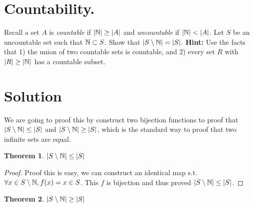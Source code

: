 
\newtheorem{theorem}{Theorem}
\newtheorem{lemma}[theorem]{Lemma}
\newtheorem{definition}{Definition}[section]


\maketitle
\thispagestyle{firststyle}
\vspace{-2.0cm}

\section{Countability.}
    Recall a set $A$ is \emph{countable} if $|\mathbb{N}| \geq |A|$ and \emph{uncountable} if $|\mathbb{N}| < |A|$.
    Let $S$ be an uncountable set such that $\mathbb{N} \subset S$.
    Show that $|S \setminus \mathbb{N}| = |S|.$
    {\bf Hint:}
    Use the facts that
    1) the union of two countable sets is countable,
    and
    2) every set $R$ with $|R| \geq |\mathbb{N}|$ has a countable subset.

\section*{Solution}

We are going to proof this by construct two bijection functions to proof that $|S \setminus \mathbb{N}| \le |S|$ and $|S \setminus \mathbb{N}| \ge |S|$, which is the standard way to proof that two infinite sets are equal.

\begin{theorem}
    $|S \setminus \mathbb{N}| \le |S|$
\end{theorem}

\begin{proof}
    Proof this is easy, we can construct an identical map s.t. $\forall x \in S \setminus \mathbb{N}, f(x) = x \in S$.
    This $f$ is bijection and thus proved $|S \setminus \mathbb{N}| \le |S|$.
\end{proof}

\begin{theorem}
    $|S \setminus \mathbb{N}| \ge |S|$
\end{theorem}

